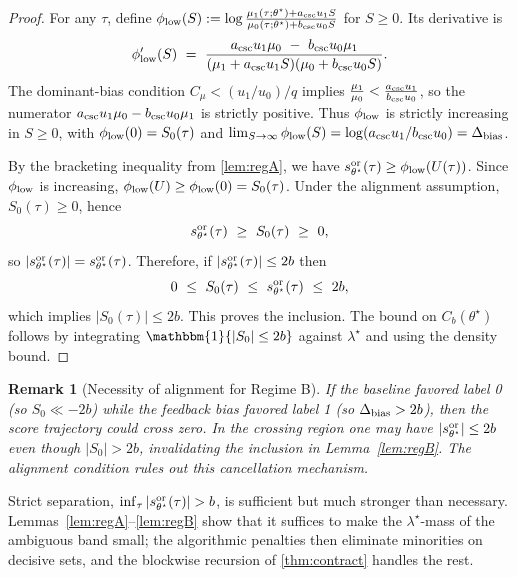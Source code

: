 \documentclass{statsoc}
\newtheorem{remark}[remark]{Remark}
\newcommand{\1}{\mathbbm{1}}
\begin{document}
\begin{proof}
For any $\tau$, define $\phi_{\rm low}(S):=\log\frac{\mu_1(\tau;\theta^\star)+a_{\rm csc}u_1 S}{\mu_0(\tau;\theta^\star)+b_{\rm csc}u_0 S}$ for $S\ge 0$. Its derivative is
\[
\phi_{\rm low}'(S)\ =\ \frac{a_{\rm csc}u_1 \mu_0\ -\ b_{\rm csc}u_0 \mu_1}{(\mu_1+a_{\rm csc}u_1 S)(\mu_0+b_{\rm csc}u_0 S)}.
\]
The dominant-bias condition $C_\mu < (u_1/u_0)/q$ implies $\frac{\mu_1}{\mu_0} < \frac{a_{\rm csc} u_1}{b_{\rm csc} u_0}$, so the numerator $a_{\rm csc} u_1 \mu_0 - b_{\rm csc} u_0 \mu_1$ is strictly positive. Thus $\phi_{\rm low}$ is strictly increasing in $S\ge 0$, with $\phi_{\rm low}(0)=S_0(\tau)$ and $\lim_{S\to\infty}\phi_{\rm low}(S)=\log(a_{\rm csc}u_1/b_{\rm csc}u_0)=\Delta_{\rm bias}$.

By the bracketing inequality from \cref{lem:regA}, we have $s^{\rm or}_{\theta^\star}(\tau)\ge \phi_{\rm low}(U(\tau))$. Since $\phi_{\rm low}$ is increasing, $\phi_{\rm low}(U)\ge \phi_{\rm low}(0)=S_0(\tau)$. Under the alignment assumption, $S_0(\tau)\ge 0$, hence
\[
s^{\rm or}_{\theta^\star}(\tau)\ \ge\ S_0(\tau)\ \ge\ 0,
\]
so $|s^{\rm or}_{\theta^\star}(\tau)| = s^{\rm or}_{\theta^\star}(\tau)$. Therefore, if $|s^{\rm or}_{\theta^\star}(\tau)|\le 2b$ then
\[
0\ \le\ S_0(\tau)\ \le\ s^{\rm or}_{\theta^\star}(\tau)\ \le\ 2b,
\]
which implies $|S_0(\tau)|\le 2b$. This proves the inclusion. The bound on $C_b(\theta^\star)$ follows by integrating $\1\{|S_0|\le 2b\}$ against $\lambda^\star$ and using the density bound.
\end{proof}

\begin{remark}[Necessity of alignment for Regime B]
If the baseline favored label 0 (so $S_0\ll -2b$) while the feedback bias favored label 1 (so $\Delta_{\rm bias}>2b$), then the score trajectory could cross zero. In the crossing region one may have $|s^{\rm or}_{\theta^\star}|\le 2b$ even though $|S_0|>2b$, invalidating the inclusion in Lemma~\ref{lem:regB}. The alignment condition rules out this cancellation mechanism.
\end{remark}

Strict separation, $\inf_\tau |s^{\rm or}_{\theta^\star}(\tau)|>b$, is sufficient but much stronger than necessary. Lemmas~\ref{lem:regA}--\ref{lem:regB} show that it suffices to make the $\lambda^\star$-mass of the ambiguous band small; the algorithmic penalties then eliminate minorities on decisive sets, and the blockwise recursion of \cref{thm:contract} handles the rest.
\end{document}
